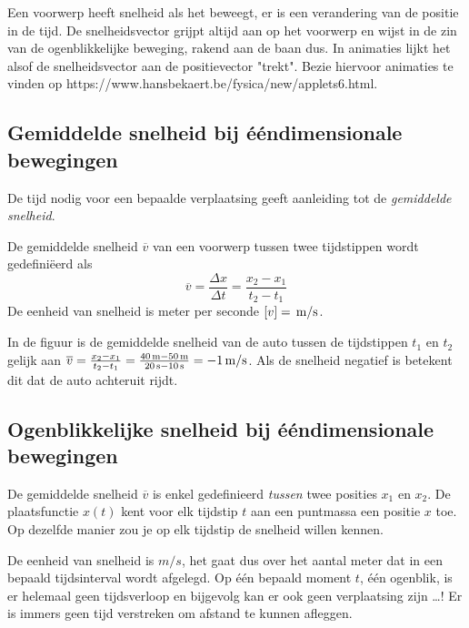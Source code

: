 \documentclass{ximera}
\begin{document}
	\author{Bart Lambregs,Vincent Gellens}
    \xmsource\xmuitleg

Een voorwerp heeft snelheid als het beweegt, er is een verandering van de positie in de tijd.
De snelheidsvector grijpt altijd aan op het voorwerp en wijst in de zin van de ogenblikkelijke beweging, rakend aan de baan dus.
In animaties lijkt het alsof de snelheidsvector aan de positievector "trekt". Bezie hiervoor animaties te vinden op https://www.hansbekaert.be/fysica/new/applets6.html.


	\subsection*{Gemiddelde snelheid bij ééndimensionale bewegingen}


De tijd nodig voor een bepaalde verplaatsing geeft aanleiding tot de \textit{gemiddelde snelheid}. 


\begin{definition}
	
De gemiddelde snelheid $\overline{v}$ van een voorwerp tussen twee tijdstippen wordt gedefiniëerd als
\[
\overline{v}=\frac{\Delta x}{\Delta t}=\frac{x_2-x_1}{t_2-t_1}
\]
De eenheid van snelheid is meter per seconde $[v]=\rm\,m/s$. 
\end{definition}

In de figuur is de gemiddelde snelheid van de auto tussen de tijdstippen $t_1$ en $t_2$ gelijk aan $\overline{v}=\frac{x_2-x_1}{t_2-t_1}=\frac{40\rm\,m-50\rm\,m}{20\rm\,s-10\rm\,s}=-1\rm\,m/s$. Als de snelheid negatief is betekent dit dat de auto achteruit rijdt.



\subsection*{Ogenblikkelijke snelheid bij ééndimensionale bewegingen}

De gemiddelde snelheid \(\overline{v}\) is enkel gedefinieerd \textit{tussen} twee posities \(x_1\) en \(x_2\). De plaatsfunctie \(x(t)\) kent voor elk tijdstip \(t\) aan een puntmassa een positie \(x\) toe. Op dezelfde manier zou je op elk tijdstip de snelheid willen kennen. 

De eenheid van snelheid is \(m/s\), het gaat dus over het aantal meter dat in een bepaald tijds\-in\-ter\-val wordt afgelegd. Op één bepaald moment \(t\), één ogenblik, is er helemaal geen tijdsverloop en bijgevolg kan er ook geen verplaatsing zijn \ldots! Er is immers geen tijd verstreken om afstand te kunnen afleggen.
\end{document}
